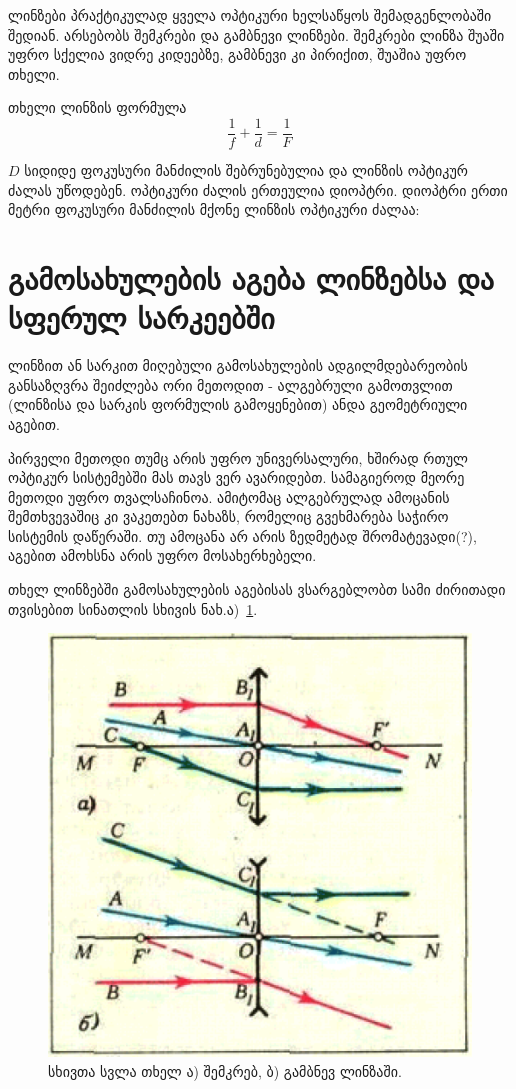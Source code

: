 \documentclass[a4paper]{book}
\begin{document}
ლინზები პრაქტიკულად ყველა ოპტიკური ხელსაწყოს შემადგენლობაში შედიან. არსებობს შემკრები და გამბნევი ლინზები. შემკრები ლინზა შუაში უფრო სქელია ვიდრე კიდეებზე, გამბნევი კი პირიქით, შუაშია უფრო თხელი.

თხელი ლინზის ფორმულა
	\begin{equation}
		\frac{1}{f} + \frac{1}{d} = \frac{1}{F}
	\end{equation}

$D$ სიდიდე ფოკუსური მანძილის შებრუნებულია და ლინზის ოპტიკურ ძალას უწოდებენ. ოპტიკური ძალის ერთეულია დიოპტრი. დიოპტრი ერთი მეტრი ფოკუსური მანძილის მქონე ლინზის ოპტიკური ძალაა:


\section{გამოსახულების აგება ლინზებსა და სფერულ სარკეებში}
ლინზით ან სარკით მიღებული გამოსახულების ადგილმდებარეობის განსაზღვრა შეიძლება ორი მეთოდით - ალგებრული გამოთვლით (ლინზისა და სარკის ფორმულის გამოყენებით) ანდა გეომეტრიული აგებით.

პირველი მეთოდი თუმც არის უფრო უნივერსალური, ხშირად რთულ ოპტიკურ სისტემებში მას თავს ვერ ავარიდებთ. სამაგიეროდ მეორე მეთოდი უფრო თვალსაჩინოა. ამიტომაც ალგებრულად ამოცანის შემთხვევაშიც კი ვაკეთებთ ნახაზს, რომელიც გვეხმარება საჭირო სისტემის დაწერაში. თუ ამოცანა არ არის ზედმეტად შრომატევადი(?), აგებით ამოხსნა არის უფრო მოსახერხებელი.

თხელ ლინზებში გამოსახულების აგებისას ვსარგებლობთ სამი ძირითადი თვისებით სინათლის სხივის ნახ.ა)~\ref{fig:optics_1}.
		\begin{figure}[h]
		   \centering
           \includegraphics[width=0.5\columnwidth]{figures/optics_1}
           \caption{სხივთა სვლა თხელ ა) შემკრებ, ბ) გამბნევ ლინზაში.}
           \label{fig:optics_1}
        \end{figure}
\end{document}
